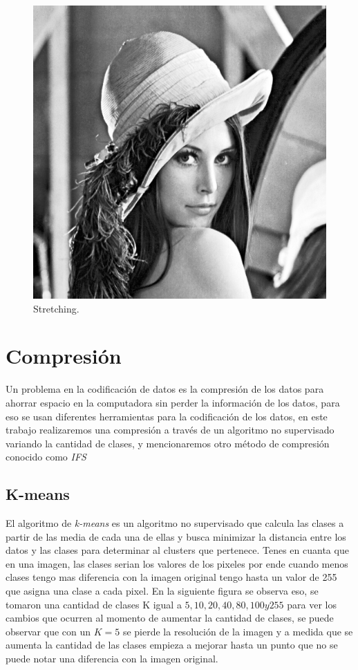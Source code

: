\begin{figure}[H]
	\centering
	\includegraphics[scale=0.5]{imagenes/stretching.png}

	\caption{Stretching\label{fig:st}.}
\end{figure}


\section{Compresión}

Un problema en la codificación de datos es la compresión de los datos para ahorrar espacio en la computadora sin perder la información de los datos, para eso se usan diferentes herramientas para la codificación de los datos, en este trabajo realizaremos una compresión a través de un algoritmo no supervisado variando la cantidad de clases, y mencionaremos otro método de compresión conocido como \textit{IFS}

\subsection{K-means}

	El algoritmo de \textit{k-means} es un algoritmo no supervisado que calcula las clases a partir de las media de cada una de ellas y busca minimizar la distancia entre los datos y las clases para determinar al clusters que pertenece. Tenes en cuanta que en una imagen, las clases serian los valores de los pixeles por ende cuando menos clases tengo mas diferencia con la imagen original tengo hasta un valor de 255 que asigna una clase a cada pixel. En la siguiente figura se observa eso, se tomaron una cantidad de clases K igual a $5,10,20,40,80,100 y 255$ para ver los cambios que ocurren al momento de aumentar la cantidad de clases, se puede observar que con un $K=5$ se pierde la resolución de la imagen y a medida que se aumenta la cantidad de las clases empieza a mejorar hasta un punto que no se puede notar una diferencia con la imagen original. 

